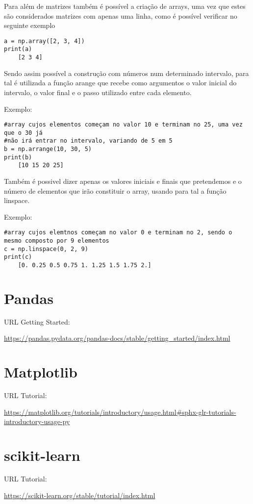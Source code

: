 \documentclass{article}
\begin{document}
Para al\'em de matrizes tamb\'em \'e poss\'ivel a cria\c c\~ao de arrays, uma vez que estes s\~ao considerados matrizes com apenas uma linha, como \'e poss\'ivel verificar no seguinte exemplo

\begin{lstlisting}
a = np.array([2, 3, 4])
print(a)
	[2 3 4]
\end{lstlisting}

Sendo assim poss\'ivel a construção com n\'umeros num determinado intervalo, para tal \'e utilizada a fun\c c\~ao arange que recebe como argumentos o valor inicial do intervalo, o valor final e o passo utilizado entre cada elemento.

Exemplo:

\begin{lstlisting}
#array cujos elementos começam no valor 10 e terminam no 25, uma vez que o 30 já 
#não irá entrar no intervalo, variando de 5 em 5
b = np.arrange(10, 30, 5)
print(b)
	[10 15 20 25]
\end{lstlisting}

Também é possivel dizer apenas os valores iniciais e finais que pretendemos e o n\'umero de elementos que ir\~ao constituir o array, usando para tal a fun\c c\~ao linspace.

Exemplo:

\begin{lstlisting}
#array cujos elemtnos começam no valor 0 e terminam no 2, sendo o mesmo composto por 9 elementos
c = np.linspace(0, 2, 9)
print(c)
	[0. 0.25 0.5 0.75 1. 1.25 1.5 1.75 2.]
\end{lstlisting}
\section{Pandas}
URL Getting Started:

\url{https://pandas.pydata.org/pandas-docs/stable/getting_started/index.html}

\section{Matplotlib}
URL Tutorial:

\url{https://matplotlib.org/tutorials/introductory/usage.html#sphx-glr-tutorials-introductory-usage-py}

\section{scikit-learn}
URL Tutorial:

\url{https://scikit-learn.org/stable/tutorial/index.html}
    
\end{document}
